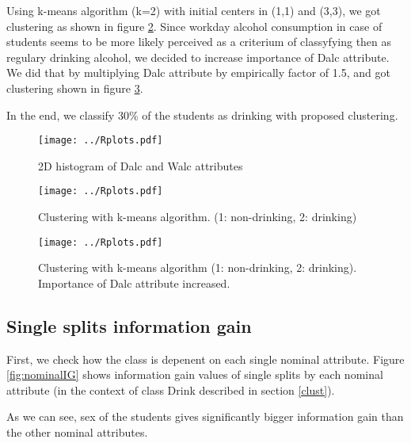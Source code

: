 \documentclass[a4paper]{article}
\begin{document}
\begin{multicols}{2}
Using k-means algorithm (k=2) with initial centers in (1,1) and (3,3), we got clustering as shown in figure \ref{fig:clust}.
Since workday alcohol consumption in case of students seems
to be more likely perceived as a criterium of classyfying then as
regulary drinking alcohol,
we decided to increase importance of Dalc attribute.
We did that by multiplying Dalc attribute by empirically factor of 1.5, and got clustering shown in figure \ref{fig:clust2}.

In the end, we classify 30\% of the students as drinking with proposed clustering.




\begin{figure}[H]
    \centering
    \texttt{[image: ../Rplots.pdf]}
    \label{fig:hist2D}
    \caption[]{2D histogram of Dalc and Walc attributes}
\end{figure}

\begin{figure}[H]
    \centering
    \texttt{[image: ../Rplots.pdf]}
    \label{fig:clust}
    \caption[]{Clustering with k-means algorithm. (1: non-drinking, 2: drinking)}
\end{figure}

\begin{figure}[H]
    \centering
    \texttt{[image: ../Rplots.pdf]}
    \label{fig:clust2}
    \caption[]{Clustering with k-means algorithm (1: non-drinking, 2: drinking). Importance of Dalc attribute increased.}
\end{figure}

\subsection{Single splits information gain}
\label{xent}
First, we check how the class is depenent on each single nominal attribute.
Figure \ref{fig:nominalIG} shows information gain values
of single splits by each nominal attribute (in the context of class Drink described in section \ref{clust}).

As we can see, sex of the students gives significantly bigger information gain
than the other nominal attributes.

% 


\end{multicols}
\end{document}
